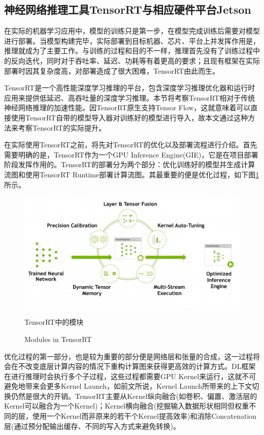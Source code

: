 \subsection{神经网络推理工具TensorRT与相应硬件平台Jetson}
\par 在实际的机器学习应用中，模型的训练只是第一步，在模型完成训练后需要对模型进行部署。当模型构建完毕，实际部署到目标机器、芯片、平台上并发挥作用是，推理就成为了主要工作。与训练的过程和目的不一样，推理首先没有了训练过程中的反向迭代，同时对于吞吐率、延迟、功耗等有着更高的要求；且现有框架在实际部署时因其复杂度高，对部署造成了很大困难，TensorRT由此而生。
\par TensorRT是一个高性能深度学习推理的平台，包含深度学习推理优化器和运行时应用来提供低延迟、高吞吐量的深度学习推理。本节将考察TensorRT相对于传统神经网络推理的加速性能\cite{TENSORRT}。因TensorRT原生支持Tensor Flow，这就意味着可以直接使用TensorRT自带的模型导入器对训练好的模型进行导入，故本文通过这种方法来考察TensorRT的实际提升。
\par 在实际使用TensorRT之前，将先对TensorRT的优化以及部署流程进行介绍。首先需要明确的是，TensorRT作为一个GPU Inference Engine(GIE)，它是在项目部署阶段发挥作用的。TensorRT的部署分为两个部分：优化训练好的模型并生成计算流图和使用TensorRT Runtime部署计算流图。其最重要的便是优化过程，如下图\ref{Fig.TensorRT}所示\cite{TENSORRTDOC}。
\begin{figure}
	\centering
	\includegraphics[width=15cm]{figures/TensorRT.jpg}
	\renewcommand{\thefigure}{\arabic{section}-\arabic{figure} }
	\renewcommand{\figurename}{图}
	\caption{TensorRT中的模块\cite{TENSORRT}}
	\addtocounter{figure}{-1}
	\renewcommand{\thefigure}{\arabic{section}-\arabic{figure} }
	\renewcommand{\figurename}{Figure}
	\caption{Modules in TensorRT}
	\label{Fig.TensorRT}
\end{figure}
\par 优化过程的第一部分，也是较为重要的部分便是网络层和张量的合成，这一过程将会在不改变底层计算内容的情况下重构计算图来获得更高效的计算方式。DL框架在进行推理时会执行多个子过程，这些过程都需要GPU Kernel来运行，这就不可避免地带来会更多Kernel Launch，如前文所说，Kernel Launch所带来的上下文切换仍然是很大的开销。TensorRT主要从Kernel纵向融合(如卷积、偏置、激活层的Kernel可以融合为一个Kernel)；Kernel横向融合(挖掘输入数据形状相同但权重不同的层，使用一个Kernel而非原来的若干个Kernel提高效率)和消除Concatenation层(通过预分配输出缓存、不同的写入方式来避免转换)。
